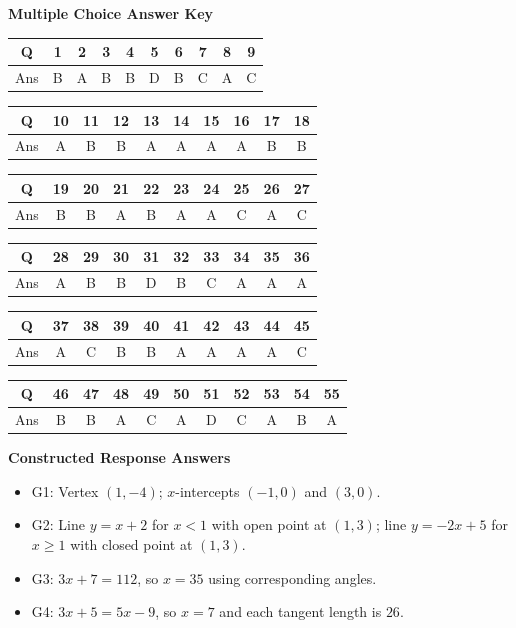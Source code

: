 \documentclass[11pt]{article}
\renewcommand{\arraystretch}{1.18}
\begin{document}
\textbf{Multiple Choice Answer Key}
\begin{center}
\renewcommand{\arraystretch}{1.2}
\begin{tabular}{|c|ccccccccc|}
\hline
Q & 1&2&3&4&5&6&7&8&9\\ \hline
Ans & B&A&B&B&D&B&C&A&C\\ \hline
\end{tabular}

\begin{tabular}{|c|ccccccccc|}
\hline
Q & 10&11&12&13&14&15&16&17&18\\ \hline
Ans & A&B&B&A&A&A&A&B&B\\ \hline
\end{tabular}

\begin{tabular}{|c|ccccccccc|}
\hline
Q & 19&20&21&22&23&24&25&26&27\\ \hline
Ans & B&B&A&B&A&A&C&A&C\\ \hline
\end{tabular}

\begin{tabular}{|c|ccccccccc|}
\hline
Q & 28&29&30&31&32&33&34&35&36\\ \hline
Ans & A&B&B&D&B&C&A&A&A\\ \hline
\end{tabular}

\begin{tabular}{|c|ccccccccc|}
\hline
Q & 37&38&39&40&41&42&43&44&45\\ \hline
Ans & A&C&B&B&A&A&A&A&C\\ \hline
\end{tabular}

\begin{tabular}{|c|cccccccccc|}
\hline
Q & 46&47&48&49&50&51&52&53&54&55\\ \hline
Ans & B&B&A&C&A&D&C&A&B&A\\ \hline
\end{tabular}
\end{center}

\textbf{Constructed Response Answers}
\begin{itemize}
\item G1: Vertex $(1,-4)$; $x$-intercepts $(-1,0)$ and $(3,0)$.
\item G2: Line $y=x+2$ for $x<1$ with open point at $(1,3)$; line $y=-2x+5$ for $x\geq1$ with closed point at $(1,3)$.
\item G3: $3x+7=112$, so $x=35$ using corresponding angles.
\item G4: $3x+5=5x-9$, so $x=7$ and each tangent length is $26$.
\end{itemize}
\end{document}
